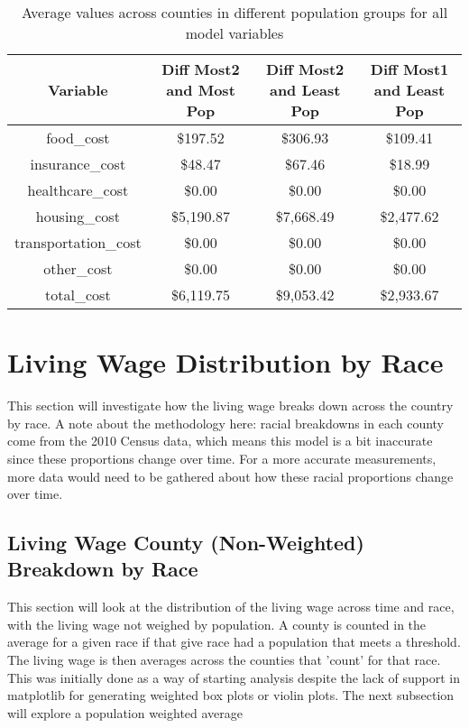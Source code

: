 \begin{table}[H]
\centering
 \begin{tabular}{||c c c c||} 
 \hline
 Variable & Diff Most2 and Most Pop	& Diff Most2 and Least Pop & Diff Most1 and Least Pop \\ [0.5ex] 
 \hline\hline
 food\_cost & \$197.52 & \$306.93 & \$109.41 \\ 
 insurance\_cost & \$48.47 & \$67.46 & \$18.99 \\
 healthcare\_cost & \$0.00 &	\$0.00 & \$0.00 \\
 housing\_cost &	\$5,190.87 &	\$7,668.49 &	 \$2,477.62 \\
 transportation\_cost & \$0.00 & \$0.00 & \$0.00 \\
 other\_cost & \$0.00 & \$0.00 & \$0.00 \\
 total\_cost & \$6,119.75 & \$9,053.42 & \$2,933.67 \\ [1ex] 
 \hline
 \end{tabular}
 \label{t:ch4_table_variable_delta_by_population}
 \caption{Average values across counties in different population groups for all model variables}
\end{table}




\section{Living Wage Distribution by Race}

This section will investigate how the living wage breaks down across the country by race. A note about the methodology here: racial breakdowns in each county come from the 2010 Census data, which means this model is a bit inaccurate since these proportions change over time. For a more accurate measurements, more data would need to be gathered about how these racial proportions change over time.

\subsection{Living Wage County (Non-Weighted) Breakdown by Race}

This section will look at the distribution of the living wage across time and race, with the living wage not weighed by population. A county is counted in the average for a given race if that give race had a population that meets a threshold. The living wage is then averages across the counties that 'count' for that race. This was initially done as a way of starting analysis despite the lack of support in matplotlib for generating weighted box plots or violin plots. The next subsection will explore a population weighted average

